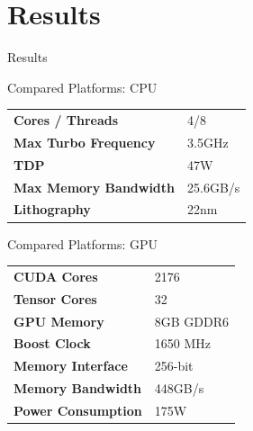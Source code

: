 \setlength{\parskip}{\baselineskip}
\section{Results}

\begin{frame}
	\huge Results
\end{frame}

\begin{frame}{Compared Platforms: CPU}
	\begin{table}[H]
		\centering
		\begin{tabular}{ll}
			\toprule
			\textbf{Cores / Threads}      & 4/8      \\
			\textbf{Max Turbo Frequency}  & 3.5GHz   \\
			\textbf{TDP}                  & 47W      \\
			\textbf{Max Memory Bandwidth} & 25.6GB/s \\
			\textbf{Lithography}          & 22nm     \\
			\bottomrule
		\end{tabular}
	\end{table}
\end{frame}

\begin{frame}{Compared Platforms: GPU}
	\begin{table}[H]
		\centering
		\begin{tabular}{ll}
			\toprule
			\textbf{CUDA Cores}        & 2176      \\
			\textbf{Tensor Cores}      & 32        \\
			\textbf{GPU Memory}        & 8GB GDDR6 \\
			\textbf{Boost Clock}       & 1650 MHz  \\
			\textbf{Memory Interface}  & 256-bit   \\
			\textbf{Memory Bandwidth}  & 448GB/s   \\
			\textbf{Power Consumption} & 175W      \\
			\bottomrule
		\end{tabular}
	\end{table}
\end{frame}

